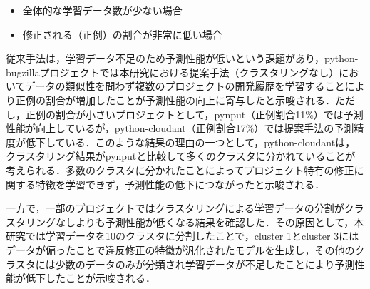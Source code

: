 \documentclass[T,J]{fose} %
\newcommand{\todo}[1]{\colorbox{yellow}{{\bf TODO}:}{\color{red} {\textbf{[#1]}}}}
\begin{document}
\begin{itemize}
    \item 全体的な学習データ数が少ない場合
    \item 修正される（正例）の割合が非常に低い場合
\end{itemize}

従来手法は，学習データ不足のため予測性能が低いという課題があり，python-bugzillaプロジェクトでは本研究における提案手法（クラスタリングなし）においてデータの類似性を問わず複数のプロジェクトの開発履歴を学習することにより正例の割合が増加したことが予測性能の向上に寄与したと示唆される．ただし，正例の割合が小さいプロジェクトとして，pynput（正例割合11\%）では予測性能が向上しているが，python-cloudant（正例割合17\%）では提案手法の予測精度が低下している．このような結果の理由の一つとして，python-cloudantは，クラスタリング結果がpynputと比較して多くのクラスタに分かれていることが考えられる．多数のクラスタに分かれたことによってプロジェクト特有の修正に関する特徴を学習できず，予測性能の低下につながったと示唆される．

一方で，一部のプロジェクトではクラスタリングによる学習データの分割がクラスタリングなしよりも予測性能が低くなる結果を確認した．その原因として，本研究では学習データを10のクラスタに分割したことで，cluster 1とcluster 3にはデータが偏ったことで違反修正の特徴が汎化されたモデルを生成し，その他のクラスタには少数のデータのみが分類され学習データが不足したことにより予測性能が低下したことが示唆される．
\end{document}
